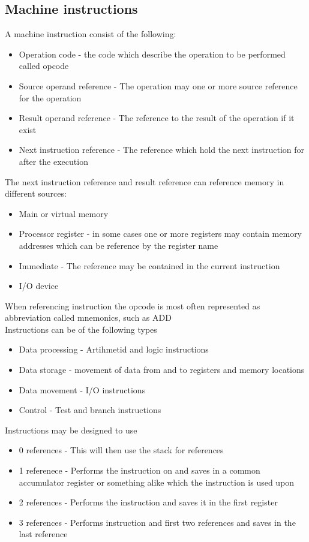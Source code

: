 \documentclass[12pt, a4paper]{article}
\begin{document}
		\subsection{Machine instructions}
			A machine instruction consist of the following:
			\begin{itemize}
				\item Operation code - the code which describe the operation to be performed called opcode
				\item Source operand reference - The operation may one or more source reference for the operation
				\item Result operand reference - The reference to the result of the operation if it exist
				\item Next instruction reference - The reference which hold the next instruction for after the execution
			\end{itemize}
			The next instruction reference and result reference can reference memory in different sources:
			\begin{itemize}
				\item Main or virtual memory
				\item Processor register - in some cases one or more registers may contain memory addresses which can be reference by the register name
				\item Immediate - The reference may be contained in the current instruction
				\item I/O device 
			\end{itemize}
			When referencing instruction the opcode is most often represented as abbreviation called mnemonics, such as ADD\\
			Instructions can be of the following types
			\begin{itemize}
				\item Data processing - Artihmetid and logic instructions
				\item Data storage - movement of data from and to registers and memory locations
				\item Data movement - I/O instructions
				\item Control - Test and branch instructions
			\end{itemize}
			Instructions may be designed to use 
			\begin{itemize}
				\item 0 references - This will then use the stack for references
				\item 1 referenece - Performs the instruction on and saves in a common accumulator register or something alike which the instruction is used upon 
				\item 2 references - Performs the instruction and saves it in the first register
				\item 3 references - Performs instruction and first two references and saves in the last reference
			\end{itemize}
\end{document}
